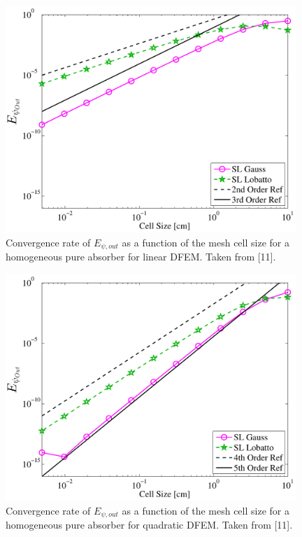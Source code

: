 %
%
\begin{figure}[!hbp]
\centering
\includegraphics[width=11cm]{chapter2_constant_xs/Linear_L2Out_err-eps-converted-to.pdf}
\caption{Convergence rate of $E_{\psi,out}$ as a function of the mesh cell size for a homogeneous pure absorber for linear DFEM.  Taken from [11].}
\label{fig:multi_L2Out_p1}
\end{figure}
\begin{figure}[!htp]
\centering
\includegraphics[width=11cm]{chapter2_constant_xs/Quadratic_L2Out_err-eps-converted-to.pdf}
\caption{Convergence rate of $E_{\psi,out}$ as a function of the mesh cell size for a homogeneous pure absorber for quadratic DFEM.  Taken from [11].}
\label{fig:multi_L2Out_p2}
\end{figure}

